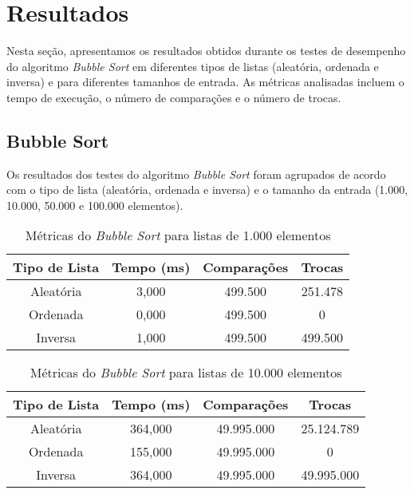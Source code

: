 \documentclass[a4paper,12pt]{article}
\begin{document}
\section{Resultados}

Nesta seção, apresentamos os resultados obtidos durante os testes de desempenho do algoritmo \textit{Bubble Sort} em diferentes tipos de listas (aleatória, ordenada e inversa) e para diferentes tamanhos de entrada. As métricas analisadas incluem o tempo de execução, o número de comparações e o número de trocas.

\subsection{Bubble Sort}

Os resultados dos testes do algoritmo \textit{Bubble Sort} foram agrupados de acordo com o tipo de lista (aleatória, ordenada e inversa) e o tamanho da entrada (1.000, 10.000, 50.000 e 100.000 elementos).

\begin{table}[H]
\centering
\caption{Métricas do \textit{Bubble Sort} para listas de 1.000 elementos}
\begin{tabular}{|c|c|c|c|}
\hline
\textbf{Tipo de Lista} & \textbf{Tempo (ms)} & \textbf{Comparações} & \textbf{Trocas} \\ \hline
Aleatória              & 3,000               & 499.500              & 251.478         \\ \hline
Ordenada               & 0,000               & 499.500              & 0               \\ \hline
Inversa                & 1,000               & 499.500              & 499.500         \\ \hline
\end{tabular}
\end{table}

\begin{table}[H]
\centering
\caption{Métricas do \textit{Bubble Sort} para listas de 10.000 elementos}
\begin{tabular}{|c|c|c|c|}
\hline
\textbf{Tipo de Lista} & \textbf{Tempo (ms)} & \textbf{Comparações} & \textbf{Trocas} \\ \hline
Aleatória              & 364,000             & 49.995.000           & 25.124.789      \\ \hline
Ordenada               & 155,000             & 49.995.000           & 0               \\ \hline
Inversa                & 364,000             & 49.995.000           & 49.995.000      \\ \hline
\end{tabular}
\end{table}
\end{document}
